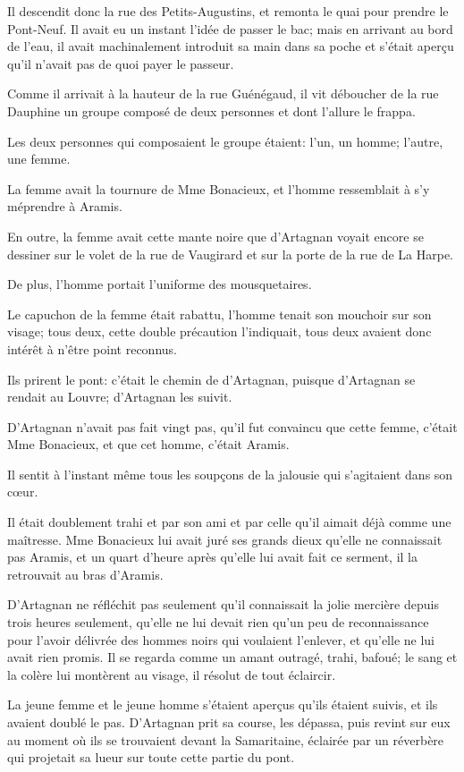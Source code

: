 Il descendit donc la rue des Petits-Augustins, et remonta le quai pour prendre le Pont-Neuf. Il avait eu un instant l'idée de passer le bac; mais en arrivant au bord de l'eau, il avait machinalement introduit sa main dans sa poche et s'était aperçu qu'il n'avait pas de quoi payer le passeur. 

Comme il arrivait à la hauteur de la rue Guénégaud, il vit déboucher de la rue Dauphine un groupe composé de deux personnes et dont l'allure le frappa. 

Les deux personnes qui composaient le groupe étaient: l'un, un homme; l'autre, une femme. 

La femme avait la tournure de Mme Bonacieux, et l'homme ressemblait à s'y méprendre à Aramis. 

En outre, la femme avait cette mante noire que d'Artagnan voyait encore se dessiner sur le volet de la rue de Vaugirard et sur la porte de la rue de La Harpe. 

De plus, l'homme portait l'uniforme des mousquetaires. 

Le capuchon de la femme était rabattu, l'homme tenait son mouchoir sur son visage; tous deux, cette double précaution l'indiquait, tous deux avaient donc intérêt à n'être point reconnus. 

Ils prirent le pont: c'était le chemin de d'Artagnan, puisque d'Artagnan se rendait au Louvre; d'Artagnan les suivit. 

D'Artagnan n'avait pas fait vingt pas, qu'il fut convaincu que cette femme, c'était Mme Bonacieux, et que cet homme, c'était Aramis. 

Il sentit à l'instant même tous les soupçons de la jalousie qui s'agitaient dans son cœur. 

Il était doublement trahi et par son ami et par celle qu'il aimait déjà comme une maîtresse. Mme Bonacieux lui avait juré ses grands dieux qu'elle ne connaissait pas Aramis, et un quart d'heure après qu'elle lui avait fait ce serment, il la retrouvait au bras d'Aramis. 

D'Artagnan ne réfléchit pas seulement qu'il connaissait la jolie mercière depuis trois heures seulement, qu'elle ne lui devait rien qu'un peu de reconnaissance pour l'avoir délivrée des hommes noirs qui voulaient l'enlever, et qu'elle ne lui avait rien promis. Il se regarda comme un amant outragé, trahi, bafoué; le sang et la colère lui montèrent au visage, il résolut de tout éclaircir. 

La jeune femme et le jeune homme s'étaient aperçus qu'ils étaient suivis, et ils avaient doublé le pas. D'Artagnan prit sa course, les dépassa, puis revint sur eux au moment où ils se trouvaient devant la Samaritaine, éclairée par un réverbère qui projetait sa lueur sur toute cette partie du pont. 

